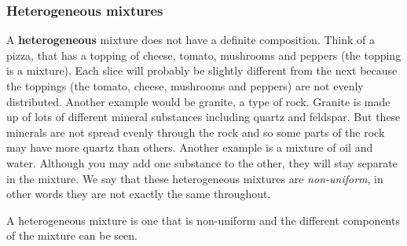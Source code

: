             \subsubsection{ Heterogeneous mixtures}
            \nopagebreak
        \label{m38708*id62715}A \textbf{heterogeneous} mixture does not have a definite composition. Think of a pizza, that has a topping of cheese, tomato, mushrooms and peppers (the topping is a mixture). Each slice will probably be slightly different from the next because the toppings (the tomato, cheese, mushrooms and peppers) are not evenly distributed. Another example would be granite, a type of rock. Granite is made up of lots of different mineral substances including quartz and feldspar. But these minerals are not spread evenly through the rock and so some parts of the rock may have more quartz than others. Another example is a mixture of oil and water. Although you may add one substance to the other, they will stay separate in the mixture. We say that these heterogeneous mixtures are \textsl{non-uniform}, in other words they are not exactly the same throughout.\par 
\label{m38708*fhsst!!!underscore!!!id89}\Definition{\label{id2405839} { Heterogeneous mixture }} 
{ \label{m38708*meaningfhsst!!!underscore!!!id89}
        A heterogeneous mixture is one that is non-uniform and the different components of the mixture can be seen.
         } 
      \label{m38708*uid6}
